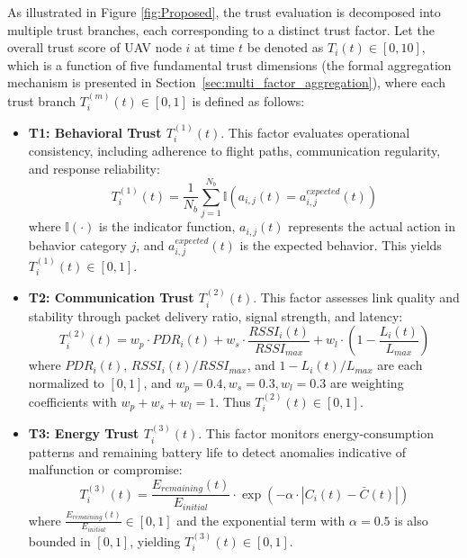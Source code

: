 \documentclass[notspecified,article,submit,moreauthors]{Definitions/mdpi}
\begin{document}
As illustrated in Figure \ref{fig:Proposed}, the trust evaluation is decomposed into multiple trust branches, each corresponding to a distinct trust factor. Let the overall trust score of UAV node $i$ at time $t$ be denoted as $T_i(t) \in [0, 10]$, which is a function of five fundamental trust dimensions (the formal aggregation mechanism is presented in Section~\ref{sec:multi_factor_aggregation}),
where each trust branch $T_i^{(m)}(t) \in [0, 1]$ is defined as follows:

\begin{itemize}
    \item \textbf{T1: Behavioral Trust $T_i^{(1)}(t)$}. This factor evaluates operational consistency, including adherence to flight paths, communication regularity, and response reliability:
    \begin{equation}\label{eq:T1}
    T_i^{(1)}(t) = \frac{1}{N_b} \sum_{j=1}^{N_b} \mathbb{I}\!\left(a_{i,j}(t) = a_{i,j}^{expected}(t)\right)
    \end{equation}
    where $\mathbb{I}(\cdot)$ is the indicator function, $a_{i,j}(t)$ represents the actual action in behavior category $j$, and $a_{i,j}^{expected}(t)$ is the expected behavior. This yields $T_i^{(1)}(t) \in [0, 1]$.
\end{itemize}

\begin{itemize}
\item \textbf{T2: Communication Trust $T_i^{(2)}(t)$}. This factor assesses link quality and stability through packet delivery ratio, signal strength, and latency:
\begin{equation}\label{eq:T2}
T_i^{(2)}(t) = w_p \cdot PDR_i(t) + w_s \cdot \frac{RSSI_i(t)}{RSSI_{max}} + w_l \cdot \left(1 - \frac{L_i(t)}{L_{max}}\right)
\end{equation}
where $PDR_i(t)$, $RSSI_i(t)/RSSI_{max}$, and $1 - L_i(t)/L_{max}$ are each normalized to $[0, 1]$, and $w_p = 0.4, w_s = 0.3, w_l = 0.3$ are weighting coefficients with $w_p + w_s + w_l = 1$. Thus $T_i^{(2)}(t) \in [0, 1]$.
\end{itemize}

\begin{itemize}
\item \textbf{T3: Energy Trust $T_i^{(3)}(t)$}. This factor monitors energy-consumption patterns and remaining battery life to detect anomalies indicative of malfunction or compromise:
\begin{equation}\label{eq:T3}
T_i^{(3)}(t) = \frac{E_{remaining}(t)}{E_{initial}} \cdot \exp\left(-\alpha \cdot \left|C_i(t) - \bar{C}(t)\right|\right)
\end{equation}
where $\frac{E_{remaining}(t)}{E_{initial}} \in [0, 1]$ and the exponential term with $\alpha = 0.5$ is also bounded in $[0, 1]$, yielding $T_i^{(3)}(t) \in [0, 1]$.
\end{itemize}
\end{document}

